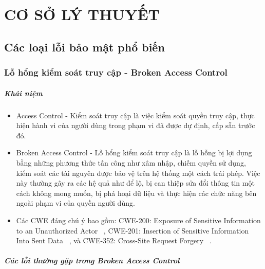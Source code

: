 \chapter{CƠ SỞ LÝ THUYẾT}

\section{Các loại lỗi bảo mật phổ biến}

\subsection{Lỗ hổng kiểm soát truy cập - Broken Access Control ~\cite{chap2bib1}}
 
\paragraph{Khái niệm}

\begin{itemize}
    \item Access Control - Kiểm soát truy cập là việc kiểm soát quyền truy cập, thực hiện hành vi của người dùng trong phạm vi đã được dự định, cấp sẵn trước đó.
    \item Broken Access Control - Lỗ hổng kiểm soát truy cập là lỗ hỗng bị lợi dụng bằng những phương thức tấn công như xâm nhập, chiếm quyền sử dụng, kiểm soát các tài nguyên được bảo vệ trên hệ thống một cách trái phép. Việc này thường gây ra các hệ quả như để lộ, bị can thiệp sửa đổi thông tin một cách không mong muốn, bị phá hoại dữ liệu và thực hiện các chức năng bên ngoài phạm vi của quyền người dùng.
    \item Các CWE đáng chú ý bao gồm: CWE-200: Exposure of Sensitive Information to an Unauthorized Actor ~\cite{chap2bib4}, CWE-201: Insertion of Sensitive Information Into Sent Data ~\cite{chap2bib5}, và CWE-352: Cross-Site Request Forgery ~\cite{chap2bib6}.
\end{itemize}

\paragraph{Các lỗi thường gặp trong Broken Access Control}

